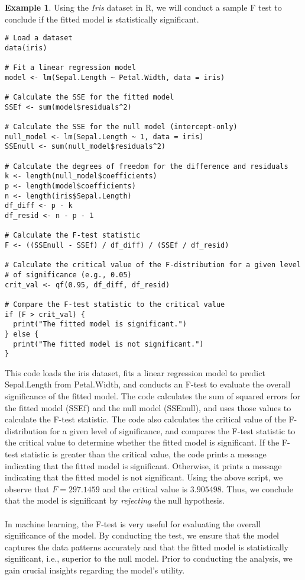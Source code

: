 \documentclass{article}[12pt]
\theoremstyle{definition}
\newtheorem{exmp}{Example}[section]
\begin{document}
\newpage

\begin{exmp}
Using the \emph{Iris} dataset in R, we will conduct a sample F test to conclude if the fitted model is statistically significant. 
\end{exmp}

\medskip

\begin{verbatim}
# Load a dataset
data(iris)

# Fit a linear regression model
model <- lm(Sepal.Length ~ Petal.Width, data = iris)

# Calculate the SSE for the fitted model
SSEf <- sum(model$residuals^2)

# Calculate the SSE for the null model (intercept-only)
null_model <- lm(Sepal.Length ~ 1, data = iris)
SSEnull <- sum(null_model$residuals^2)

# Calculate the degrees of freedom for the difference and residuals
k <- length(null_model$coefficients)
p <- length(model$coefficients)
n <- length(iris$Sepal.Length)
df_diff <- p - k
df_resid <- n - p - 1

# Calculate the F-test statistic
F <- ((SSEnull - SSEf) / df_diff) / (SSEf / df_resid)

# Calculate the critical value of the F-distribution for a given level
# of significance (e.g., 0.05)
crit_val <- qf(0.95, df_diff, df_resid)

# Compare the F-test statistic to the critical value
if (F > crit_val) {
  print("The fitted model is significant.")
} else {
  print("The fitted model is not significant.")
}
\end{verbatim}

\newpage

\noindent
This code loads the iris dataset, fits a linear regression model to predict Sepal.Length from Petal.Width, and conducts an F-test to evaluate the overall significance of the fitted model. The code calculates the sum of squared errors for the fitted model (SSEf) and the null model (SSEnull), and uses those values to calculate the F-test statistic. The code also calculates the critical value of the F-distribution for a given level of significance, and compares the F-test statistic to the critical value to determine whether the fitted model is significant. If the F-test statistic is greater than the critical value, the code prints a message indicating that the fitted model is significant. Otherwise, it prints a message indicating that the fitted model is not significant. Using the above script, we observe that $F = 297.1459$ and the critical value is $3.905498$. Thus, we conclude that the model is significant by \emph{rejecting} the null hypothesis. 
\\
\\
In machine learning, the F-test is very useful for evaluating the overall significance of the model. By conducting the test, we ensure that the model captures the data patterns accurately and that the fitted model is statistically significant, i.e., superior to the null model. Prior to conducting the analysis, we gain crucial insights regarding the model's utility.
\end{document}
